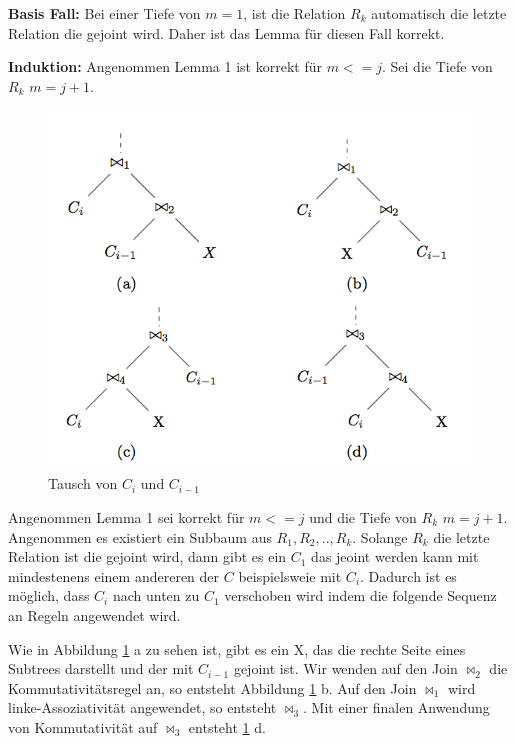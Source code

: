 \textbf{Basis Fall:} Bei einer Tiefe von $m = 1$, ist die Relation $R_k$ automatisch die letzte Relation die gejoint wird. Daher ist das Lemma für diesen Fall korrekt.

\textbf{Induktion:} Angenommen Lemma 1 ist korrekt für $m <= j$. Sei die Tiefe von $R_k$ $m = j+1$. 

\begin{figure}[ht]
  \centering
  \includegraphics[scale=0.4]{03_Regeln/00_media/SwapC1.png}
  \caption{Tausch von $C_i$ und $C_{i-1}$}
  \label{SwapC1}
\end{figure}



Angenommen Lemma 1 sei korrekt für $ m <= j$ und die Tiefe von $R_k$ $m = j + 1$. Angenommen es existiert ein Subbaum aus $R_1, R_2,.. , R_k$. Solange $R_k$ die letzte Relation ist die gejoint wird, dann gibt es ein $C_1$ das jeoint werden kann mit mindestenens einem andereren der $C$ beispielsweie mit $C_i$. Dadurch ist es möglich, dass $C_i$ nach unten zu $C_1$ verschoben wird indem die folgende Sequenz an Regeln angewendet wird.

Wie in Abbildung \ref{SwapC1} a zu sehen ist, gibt es ein X, das die rechte Seite eines Subtrees darstellt und der mit $C_{i-1}$ gejoint ist. Wir wenden auf den Join $\Join_2$ die Kommutativitätsregel an, so entsteht Abbildung \ref{SwapC1} b. Auf den Join $\Join_1$ wird linke-Assoziativität angewendet, so entsteht $\Join_3$. Mit einer finalen Anwendung von Kommutativität auf $\Join_3$ entsteht \ref{SwapC1} d.

